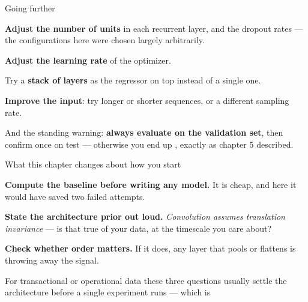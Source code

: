 \documentclass[aspectratio=169,11pt,t]{beamer}
\begin{document}
\begin{frame}[shrink=25]{Going further}
\begin{ibullets}
\item \textbf{Adjust the number of units} in each recurrent layer, and the dropout rates --- the configurations here were chosen largely arbitrarily.
\item \textbf{Adjust the learning rate} of the optimizer.
\item Try a \textbf{stack of  layers} as the regressor on top instead of a single one.
\item \textbf{Improve the input}: try longer or shorter sequences, or a different sampling rate.
\end{ibullets}
\begin{iband}[signal]
And the standing warning: \textbf{always evaluate on the validation set}, then confirm once on test --- otherwise you end up , exactly as chapter 5 described.
\end{iband}
\end{frame}

\begin{frame}[shrink=25]{What this chapter changes about how you start}
\begin{isteps}
\item \textbf{Compute the baseline before writing any model.} It is cheap, and here it would have saved two failed attempts.
\item \textbf{State the architecture prior out loud.} \textit{Convolution assumes translation invariance} --- is that true of your data, at the timescale you care about?
\item \textbf{Check whether order matters.} If it does, any layer that pools or flattens is throwing away the signal.
\end{isteps}
\begin{iband}[signal]
For transactional or operational data these three questions usually settle the architecture before a single experiment runs --- which is 
\end{iband}
\end{frame}
\end{document}
